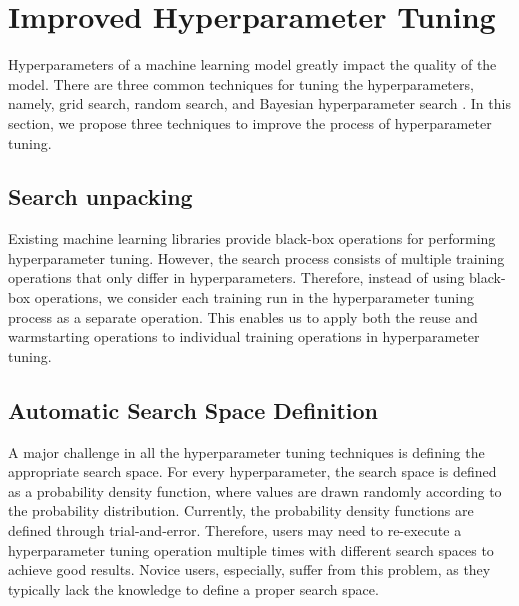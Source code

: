 \section{Improved Hyperparameter Tuning} \label{sec-hyperparam-optimization}
Hyperparameters of a machine learning model greatly impact the quality of the model.
There are three common techniques for tuning the hyperparameters, namely, grid search, random search, and Bayesian hyperparameter search \cite{hutter2011sequential,snoek2012practical}.
In this section, we propose three techniques to improve the process of hyperparameter tuning.

\subsection{Search unpacking}
Existing machine learning libraries provide black-box operations for performing hyperparameter tuning.
However, the search process consists of multiple training operations that only differ in hyperparameters.
Therefore, instead of using black-box operations, we consider each training run in the hyperparameter tuning process as a separate operation.
This enables us to apply both the reuse and warmstarting operations to individual training operations in hyperparameter tuning.

\subsection{Automatic Search Space Definition}\label{sub-section-automatic-search-definition}
A major challenge in all the hyperparameter tuning techniques is defining the appropriate search space.
For every hyperparameter, the search space is defined as a probability density function, where values are drawn randomly according to the probability distribution.
Currently, the probability density functions are defined through trial-and-error.
Therefore, users may need to re-execute a hyperparameter tuning operation multiple times with different search spaces to achieve good results.
Novice users, especially, suffer from this problem, as they typically lack the knowledge to define a proper search space.

